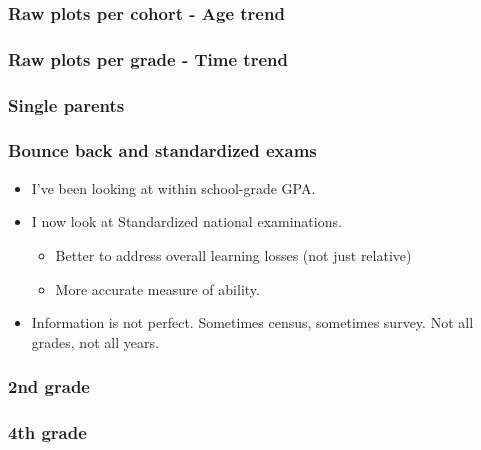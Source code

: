 \documentclass{beamer}
\begin{document}
\begin{frame}
    \label{update_scott}
    \frametitle{Raw plots per cohort - Age trend}
        {
    }
\end{frame}

\begin{frame}
    \label{update_scott}
    \frametitle{Raw plots per grade - Time trend}
        {
    }
\end{frame}

\begin{frame}
    \label{update_scott}
    \frametitle{Single parents}
        {
    }
\end{frame}

\begin{frame}
    \label{update_scott}
    \frametitle{Bounce back and standardized exams}
    \begin{itemize}
        \item I've been looking at within school-grade GPA.
        \item I now look at Standardized national examinations. 
        \begin{itemize}
            \item Better to address overall learning losses (not just relative)
            \item More accurate measure of ability.
        \end{itemize}
        \item Information is not perfect. Sometimes census, sometimes survey. Not all grades, not all years.
    \end{itemize}
\end{frame}

\begin{frame}
    \label{update_scott}
    \frametitle{2nd grade}
        {
    }
\end{frame}

\begin{frame}
    \label{update_scott}
    \frametitle{4th grade}
        {
    }
\end{frame}
\end{document}
